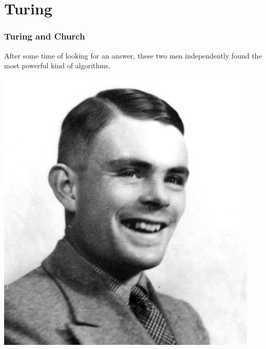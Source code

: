 \documentclass[mathserif]{beamer}
\begin{document}

\section{Turing}
\begin{frame}
  \frametitle{Turing and Church}

  After some time of looking for an answer, these two men independently found
  the most powerful kind of algorithms.
  \begin{multicols}{2}
    \includegraphics[width=0.9\linewidth]{media/turing.jpg}


\end{multicols}
\end{frame}
\end{document}
